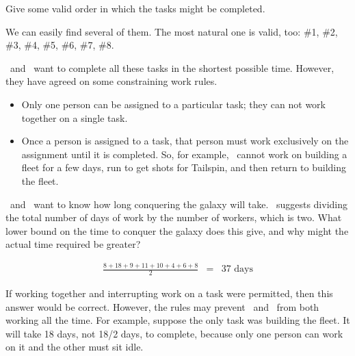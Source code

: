 \begin{problem}
\bparts

\ppart Give some valid order in which the tasks might be
completed.

\begin{solution}
We can easily find several of them. The most natural one is valid, too:
\#1, \#2, \#3, \#4, \#5, \#6, \#7, \#8.

\end{solution}
\eparts

\Jay\  and \Rongrong\  want to complete all these tasks in the
shortest possible time. However, they have agreed on some constraining
work rules.
\begin{itemize}

\item Only one person can be assigned to a particular task; they can
not work together on a single task.

\item Once a person is assigned to a task, that person must work
exclusively on the assignment until it is completed.  So, for example,
\Jay\  cannot work on building a fleet for a few days, run to get shots
for Tailspin, and then return to building the fleet.

\end{itemize}


\bparts

\ppart \Jay\  and \Rongrong\  want to know how long conquering the
galaxy will take.  \Rongrong\  suggests dividing the total number of days of
work by the number of workers, which is two.  What lower bound on the time
to conquer the galaxy does this give, and why might the actual time
required be greater?

\begin{solution}
\begin{eqnarray*}
\frac{8 + 18 + 9 + 11 + 10 + 4 + 6 + 8}{2} & = & 37 \text{ days}
\end{eqnarray*}

If working together and interrupting work on a task were permitted, then
this answer would be correct.  However, the rules may prevent \Jay\  and
\Rongrong\  from both working all the time.  For example, suppose the only task
was building the fleet.  It will take 18 days, not 18/2 days, to complete,
because only one person can work on it and the other must sit idle.
\end{solution}


\end{problem}
